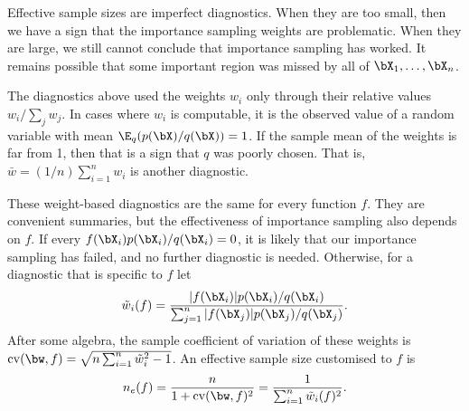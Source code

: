 Effective sample sizes are imperfect diagnostics. When they are too small, then we have a sign that the importance sampling weights are problematic. When they are large, we still cannot conclude that importance sampling has worked. It remains possible that some important region was missed by all of $\bX_1, \dots, \bX_n$.

The diagnostics above used the weights $w_i$ only through their relative values $w_i / \sum_j w_j$. In cases where $w_i$ is computable, it is the observed value of a random variable with mean $\E_q(p(\bX)/q(\bX)) = 1$. If the sample mean of the weights is far from 1, then that is a sign that $q$ was poorly chosen. That is, $\bar{w} = (1/n) \sum_{i=1}^n w_i$ is another diagnostic.

These weight-based diagnostics are the same for every function $f$. They are convenient summaries, but the effectiveness of importance sampling also depends on $f$. If every $f(\bX_i)p(\bX_i)/q(\bX_i) = 0$, it is likely that our importance sampling has failed, and no further diagnostic is needed. Otherwise, for a diagnostic that is specific to $f$ let
\[
	\tilde{w}_i(f) = \frac{|f(\bX_i)|p(\bX_i)/q(\bX_i)}{\sum_{j=1}^n |f(\bX_j)|p(\bX_j)/q(\bX_j)}.
\]
After some algebra, the sample coefficient of variation of these weights is $\mathrm{cv}(\bw, f) = \sqrt{n \sum_{i=1}^n \tilde{w}_i^2 - 1}$. An effective sample size customised to $f$ is
\begin{equation}
	n_e(f) = \frac{n}{1 + \mathrm{cv}(\bw, f)^2} = \frac{1}{\sum_{i=1}^n \tilde{w}_i(f)^2}.
	\label{eq:ESSFunctionSpecific}
\end{equation}
